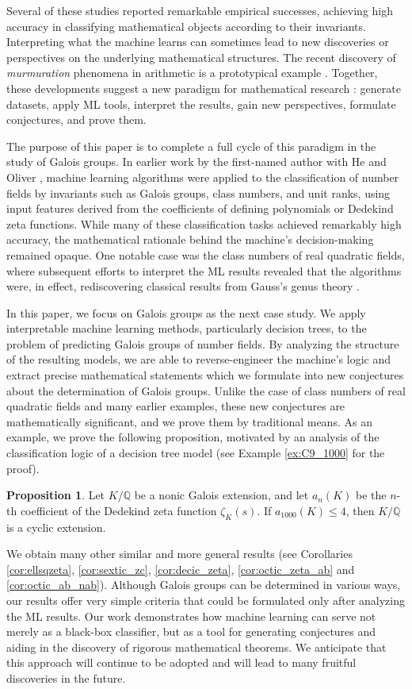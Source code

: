 \documentclass[letterpaper, 10pt]{article}
\newcommand{\bQ}{\mathbb{Q}}
\newcommand{\1}{\mathds{1}}	%
\theoremstyle{definition}
\newtheorem*{proposition*}{Proposition}
\theoremstyle{remark}
\begin{document}
Several of these studies reported remarkable empirical successes, achieving high accuracy in classifying mathematical objects according to their invariants. Interpreting what the machine learns can sometimes lead to new discoveries or perspectives on the underlying mathematical structures. The recent discovery of {\em murmuration} phenomena in arithmetic is a prototypical example \cite{HLOP, quanta}. Together, these developments suggest a new paradigm for mathematical research \cite{davies2021advancing, douglaslee_mds}: generate datasets, apply ML tools, interpret the results, gain new perspectives, formulate conjectures, and prove them.

The purpose of this paper is to complete a full cycle of this paradigm in the study of Galois groups. In earlier work by the first-named author with He and Oliver \cite{he2022machine}, machine learning algorithms were applied to the classification of number fields by invariants such as Galois groups, class numbers, and unit ranks, using input features derived from the coefficients of defining polynomials or Dedekind zeta functions. While many of these classification tasks achieved remarkably high accuracy, the mathematical rationale behind the machine's decision-making remained opaque. One notable case was the class numbers of real quadratic fields, where subsequent efforts to interpret the ML results revealed that the algorithms were, in effect, rediscovering classical results from Gauss's genus theory \cite{amir2023machine}.

In this paper, we focus on Galois groups as the next case study. We apply interpretable machine learning methods, particularly decision trees, to the problem of predicting Galois groups of number fields. By analyzing the structure of the resulting models, we are able to reverse-engineer the machine's logic and extract precise mathematical statements which we formulate into new conjectures about the determination of Galois groups. Unlike the case of class numbers of real quadratic fields and many earlier examples, these new conjectures are mathematically significant, and we prove them by traditional means.  
As an example, we prove the following  proposition, motivated by an analysis of the classification logic of a decision tree model (see Example \ref{ex:C9_1000} for the proof).
\begin{proposition*}
    Let $K / \bQ$ be a nonic Galois extension, and let $a_n(K)$ be the $n$-th coefficient of the Dedekind zeta function $\zeta_K(s)$.
     If $a_{1000}(K) \le 4$, then $K / \bQ$ is a cyclic extension.
\end{proposition*}
We obtain many other similar and more general results (see Corollaries \ref{cor:ellsqzeta}, \ref{cor:sextic_zc}, \ref{cor:decic_zeta}, \ref{cor:octic_zeta_ab} and \ref{cor:octic_ab_nab}).
Although Galois groups can be determined in various ways, our results offer very simple criteria that could be formulated only after analyzing the ML results. Our work demonstrates how machine learning can serve not merely as a black-box classifier, but as a tool for generating conjectures and aiding in the discovery of rigorous mathematical theorems.
 We anticipate that this approach will continue to be adopted and will lead to many fruitful discoveries in the future.
\end{document}
